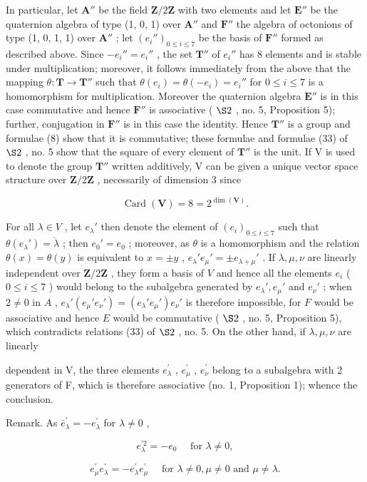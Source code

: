 In particular, let \(\mathbf{A}''\) be the field \(\mathbf{Z}/2\mathbf{Z}\) with two elements and let \(\mathbf{E}''\) be the quaternion algebra of type (1, 0, 1) over \(\mathbf{A}''\) and \(\mathbf{F}''\) the algebra of octonions of type (1, 0, 1, 1) over \(\mathbf{A}''\) ; let \((e_i'')_{0 \leq i \leq 7}\) be the basis of \(\mathbf{F}''\) formed as described above. Since \(-e_i'' = e_i''\) , the set \(\mathbf{T}''\) of \(e_i''\) has 8 elements and is stable under multiplication; moreover, it follows immediately from the above that the mapping \(\theta: \mathbf{T} \to \mathbf{T}''\) such that \(\theta(e_i) = \theta(-e_i) = e_i''\) for \(0 \leq i \leq 7\) is a homomorphism for multiplication. Moreover the quaternion algebra \(\mathbf{E}''\) is in this case commutative and hence \(\mathbf{F}''\) is associative ( \(\S 2\) , no. 5, Proposition 5); further, conjugation in \(\mathbf{F}''\) is in this case the identity. Hence \(\mathbf{T}''\) is a group and formulae (8) show that it is commutative; these formulae and formulae (33) of \(\S 2\) , no. 5 show that the square of every element of \(\mathbf{T}''\) is the unit. If V is used to denote the group \(\mathbf{T}''\) written additively, V can be given a unique vector space structure over \(\mathbf{Z}/2\mathbf{Z}\) , necessarily of dimension 3 since

\[
\operatorname{Card} (\mathbf {V}) = 8 = 2 ^ {\dim (\mathbf {V})}.
\]

For all \(\lambda \in V\) , let \(e_{\lambda}'\) then denote the element of \((e_i)_{0 \leq i \leq 7}\) such that \(\theta(e_{\lambda}') = \dot{\lambda}\) ; then \(e_0' = e_0\) ; moreover, as \(\theta\) is a homomorphism and the relation \(\theta(x) = \theta(y)\) is equivalent to \(x = \pm y\) , \(e_{\lambda}' e_{\mu}' = \pm e_{\lambda + \mu}'\) . If \(\lambda, \mu, \nu\) are linearly independent over \(\mathbf{Z}/2\mathbf{Z}\) , they form a basis of \(V\) and hence all the elements \(e_i\) ( \(0 \leqslant i \leqslant 7\) ) would belong to the subalgebra generated by \(e_{\lambda}', e_{\mu}'\) and \(e_{\nu}'\) ; when \(2 \neq 0\) in \(A\) , \(e_{\lambda}'(e_{\mu}' e_{\nu}') = (e_{\lambda}' e_{\mu}') e_{\nu}'\) is therefore impossible, for \(F\) would be associative and hence \(E\) would be commutative ( \(\S 2\) , no. 5, Proposition 5), which contradicts relations (33) of \(\S 2\) , no. 5. On the other hand, if \(\lambda, \mu, \nu\) are linearly

dependent in V, the three elements \(e_{\lambda}^{\prime}\) , \(e_{\mu}^{\prime}\) , \(e_{\nu}^{\prime}\) belong to a subalgebra with 2 generators of F, which is therefore associative (no. 1, Proposition 1); whence the conclusion.

Remark. As \(\bar{e}_{\lambda}^{\prime} = -e_{\lambda}^{\prime}\) for \(\lambda \neq 0\) ,

\[
e _ {\lambda} ^ {\prime 2} = - e _ {0} \quad \text { for } \lambda \neq 0,
\]

\[
e _ {\mu} ^ {\prime} e _ {\lambda} ^ {\prime} = - e _ {\lambda} ^ {\prime} e _ {\mu} ^ {\prime} \quad \text { for } \lambda \neq 0, \mu \neq 0 \text { and } \mu \neq \lambda .
\]

